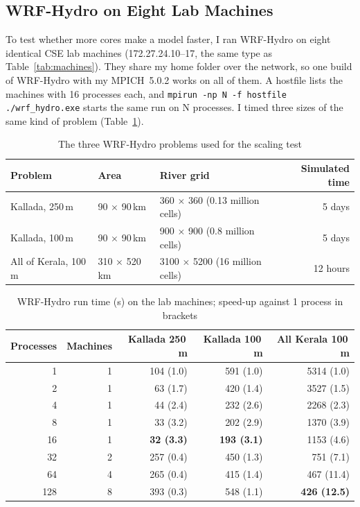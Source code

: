 \subsection{WRF-Hydro on Eight Lab Machines}
\label{sec:perf_wrfhydro}

To test whether more cores make a model faster, I ran WRF-Hydro on eight identical CSE lab machines
(172.27.24.10--17, the same type as Table~\ref{tab:machines}). They share my home folder over the
network, so one build of WRF-Hydro with my MPICH~5.0.2 works on all of them. A hostfile lists the
machines with 16 processes each, and \texttt{mpirun -np N -f hostfile ./wrf\_hydro.exe} starts the
same run on N processes. I timed three sizes of the same kind of problem
(Table~\ref{tab:wrfh_sizes}).

\begin{table}[H]
\centering
\caption{The three WRF-Hydro problems used for the scaling test}
\label{tab:wrfh_sizes}
\small
\begin{tabular}{lllr}
\toprule
\textbf{Problem} & \textbf{Area} & \textbf{River grid} & \textbf{Simulated time} \\
\midrule
Kallada, 250\,m & 90 $\times$ 90\,km & 360 $\times$ 360 (0.13 million cells) & 5 days \\
Kallada, 100\,m & 90 $\times$ 90\,km & 900 $\times$ 900 (0.8 million cells) & 5 days \\
All of Kerala, 100\,m & 310 $\times$ 520\,km & 3100 $\times$ 5200 (16 million cells) & 12 hours \\
\bottomrule
\end{tabular}
\end{table}

\begin{table}[H]
\centering
\caption{WRF-Hydro run time (s) on the lab machines; speed-up against 1 process in brackets}
\label{tab:wrfh_scaling}
\small
\begin{tabular}{rrrrr}
\toprule
\textbf{Processes} & \textbf{Machines} & \textbf{Kallada 250\,m} & \textbf{Kallada 100\,m} & \textbf{All Kerala 100\,m} \\
\midrule
1   & 1 & 104 (1.0)          & 591 (1.0)          & 5314 (1.0) \\
2   & 1 & 63 (1.7)           & 420 (1.4)          & 3527 (1.5) \\
4   & 1 & 44 (2.4)           & 232 (2.6)          & 2268 (2.3) \\
8   & 1 & 33 (3.2)           & 202 (2.9)          & 1370 (3.9) \\
16  & 1 & \textbf{32 (3.3)}  & \textbf{193 (3.1)} & 1153 (4.6) \\
32  & 2 & 257 (0.4)          & 450 (1.3)          & 751 (7.1) \\
64  & 4 & 265 (0.4)          & 415 (1.4)          & 467 (11.4) \\
128 & 8 & 393 (0.3)          & 548 (1.1)          & \textbf{426 (12.5)} \\
\bottomrule
\end{tabular}
\end{table}


